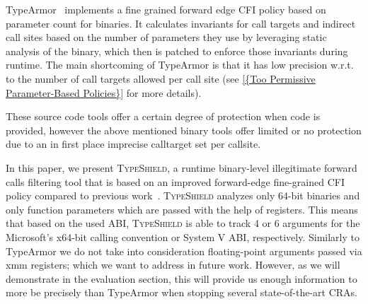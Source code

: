 TypeArmor~\cite{veen:typearmor} implements a fine grained forward edge CFI 
policy based on parameter count for binaries. It calculates invariants for call targets and indirect call sites based on
the number of parameters they use by leveraging static analysis of the binary, which then is
patched to enforce those invariants during runtime. 
The main shortcoming of TypeArmor is that it has low precision 
w.r.t. to the number of call targets allowed per call site 
(see \cref{{Too Permissive Parameter-Based Policies}} for more details).


These source code tools offer a certain degree of protection when code is provided, however 
the above mentioned binary tools offer limited or no protection due to an in first place
imprecise calltarget set per callsite.

In this paper, we present \textsc{TypeShield}, a runtime binary-level illegitimate forward calls 
filtering tool that is based on an improved forward-edge fine-grained CFI policy compared 
to previous work~\cite{veen:typearmor, crane:readactor++}.
\textsc{TypeShield} analyzes only 64-bit binaries and only function parameters 
which are passed with the help of registers. This means that based on the 
used ABI, \textsc{TypeShield} is able to track 4 or 6 arguments for the Microsoft's x64-bit calling convention
or System V ABI, respectively. Similarly to TypeArmor we do not take into consideration floating-point 
arguments passed via xmm registers; which we want to address in future work. However, as we will 
demonstrate in the evaluation section, this will provide us enough information to 
more be precisely than TypeArmor when stopping several state-of-the-art CRAs.

